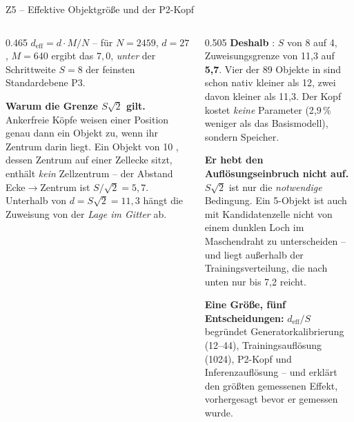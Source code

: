 \documentclass[14pt,aspectratio=169]{beamer}
\begin{document}
\begin{frame}{Z5 -- Effektive Objektgröße und der P2-Kopf}
\zusatzdicht
\begin{columns}[T,onlytextwidth]
\begin{column}{0.465\textwidth}
$d_{\text{eff}} = d \cdot M/N$ -- für $N = 2459$, $d = 27$\px, $M = 640$
ergibt das $7{,}0$\px, \emph{unter} der Schrittweite $S = 8$ der feinsten
Standardebene P3.
\smallskip

\textbf{Warum die Grenze $S\sqrt2$ gilt.} Ankerfreie Köpfe weisen einer
Position genau dann ein Objekt zu, wenn ihr Zentrum darin liegt. Ein Objekt
von 10\px{} \Oe, dessen Zentrum auf einer Zellecke sitzt, enthält
\emph{kein} Zellzentrum -- der Abstand Ecke$\rightarrow$Zentrum ist
$S/\sqrt2 = 5{,}7$\px. Unterhalb von $d = S\sqrt2 = 11{,}3$\px{} hängt die
Zuweisung von der \emph{Lage im Gitter} ab.
\end{column}
\begin{column}{0.505\textwidth}
\textbf{Deshalb }: $S$ von 8 auf 4, Zuweisungsgrenze von
11{,}3 auf \textbf{5{,}7}\px. Vier der 89 Objekte in  sind schon
nativ kleiner als 12\px, zwei davon kleiner als 11{,}3\px. Der Kopf kostet
\emph{keine} Parameter (2{,}9\,\% weniger als das Basismodell), sondern
Speicher.
\smallskip

\textbf{Er hebt den Auflösungseinbruch nicht auf.} $S\sqrt2$ ist nur die
\emph{notwendige} Bedingung. Ein 5\px-Objekt ist auch mit Kandidatenzelle
nicht von einem dunklen Loch im Maschendraht zu unterscheiden -- und liegt
außerhalb der Trainingsverteilung, die nach unten nur bis 7{,}2\px{} reicht.
\smallskip

{\color{akzent}\textbf{Eine Größe, fünf Entscheidungen:} $d_{\text{eff}}/S$
begründet Generatorkalibrierung (12--44\px), Trainingsauflösung (1024),
P2-Kopf und Inferenzauflösung -- und erklärt den größten gemessenen Effekt,
vorhergesagt bevor er gemessen wurde.}
\end{column}
\end{columns}
\end{frame}
\end{document}
